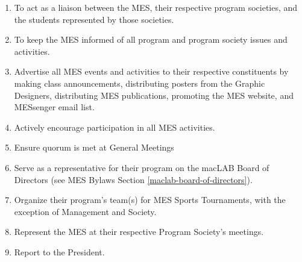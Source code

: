 \begin{enumerate}
 \begin{enumerate}
  \item
   To act as a liaison between the MES, their respective program
   societies, and the students represented by those societies.
  \item
   To keep the MES informed of all program and program society issues
   and activities.
  \item
   Advertise all MES events and activities to their respective
   constituents by making class announcements, distributing posters
   from the Graphic Designers, distributing MES publications, promoting
   the MES website, and MESsenger email list.
  \item
   Actively encourage participation in all MES activities.
  \item
   Ensure quorum is met at General Meetings
  \item
   Serve as a representative for their program on the macLAB Board of
   Directors (see MES Bylaws Section \ref{maclab-board-of-directors}).
  \item
   Organize their program's team(s) for MES Sports Tournaments, with
   the exception of Management and Society.
  \item
   Represent the MES at their respective Program Society's meetings.
  \item
   Report to the President.
 \end{enumerate}
\end{enumerate}

